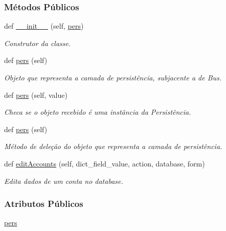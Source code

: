 \subsubsection*{Métodos Públicos}
\begin{DoxyCompactItemize}
\item 
def \hyperlink{classAdm_1_1AdmUnit_1_1IfBusAdm_a9d8de1bb17559a720c87dcbf7bafa5bd}{\+\_\+\+\_\+init\+\_\+\+\_\+} (self, \hyperlink{classAdm_1_1AdmUnit_1_1IfBusAdm_a95ea8f39fbbcddf44822e1614c712bfe}{pers})
\begin{DoxyCompactList}\small\item\em Construtor da classe. \end{DoxyCompactList}\item 
def \hyperlink{classAdm_1_1AdmUnit_1_1IfBusAdm_a58f07186cfb366e305adbbd4f7fd2b72}{pers} (self)
\begin{DoxyCompactList}\small\item\em Objeto que representa a camada de persistência, subjacente a de Bus. \end{DoxyCompactList}\item 
def \hyperlink{classAdm_1_1AdmUnit_1_1IfBusAdm_a0022f3706dcdb0d5c2795daafc2478df}{pers} (self, value)
\begin{DoxyCompactList}\small\item\em Checa se o objeto recebido é uma instância da Persistência. \end{DoxyCompactList}\item 
def \hyperlink{classAdm_1_1AdmUnit_1_1IfBusAdm_a58f07186cfb366e305adbbd4f7fd2b72}{pers} (self)
\begin{DoxyCompactList}\small\item\em Método de deleção do objeto que representa a camada de persistência. \end{DoxyCompactList}\item 
def \hyperlink{classAdm_1_1AdmUnit_1_1IfBusAdm_a01c6dd1137af994627462fab498b56e7}{edit\+Accounts} (self, dict\+\_\+field\+\_\+value, action, database, form)
\begin{DoxyCompactList}\small\item\em Edita dados de um conta no database. \end{DoxyCompactList}\end{DoxyCompactItemize}
\subsubsection*{Atributos Públicos}
\begin{DoxyCompactItemize}
\item 
\hyperlink{classAdm_1_1AdmUnit_1_1IfBusAdm_a95ea8f39fbbcddf44822e1614c712bfe}{pers}
\end{DoxyCompactItemize}


